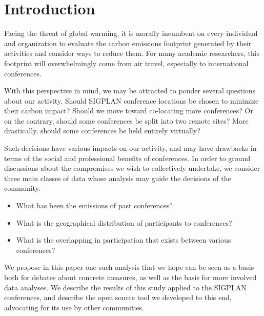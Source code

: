 \section{Introduction}

Facing the threat of global warming, it is morally incumbent on every
individual and organization to evaluate the carbon emissions footprint
generated by their activities and consider ways to reduce them.  For many
academic researchers, this footprint will overwhelmingly come from air
travel, especially to international conferences.

With this perspective in mind, we may be attracted to ponder several questions
about our activity. Should SIGPLAN conference locations be chosen to minimize
their carbon impact? Should we move toward co-locating more conferences? Or on
the contrary, should some conferences be split into two remote sites?
More drastically, should some conferences be held entirely virtually?

Such decisions have various impacts on our activity, and may have drawbacks in
terms of the social and professional benefits of conferences. 
In order to ground discussions about the compromises we wish to collectively undertake, we consider
three main classes of data whose analysis may guide the decisions of the community.
\begin{itemize}
\item What has been the emissions of past conferences?
\item What is the geographical distribution of participants to conferences?
\item What is the overlapping in participation that exists between various conferences?
\end{itemize}

We propose in this paper one such analysis that we hope can be seen as a basis both for
debates about concrete measures, as well as the basis for more involved data analyses.
We describe the results of this study applied to the SIGPLAN conferences, and describe
the open source tool we developed to this end, advocating for its use by other communities.

